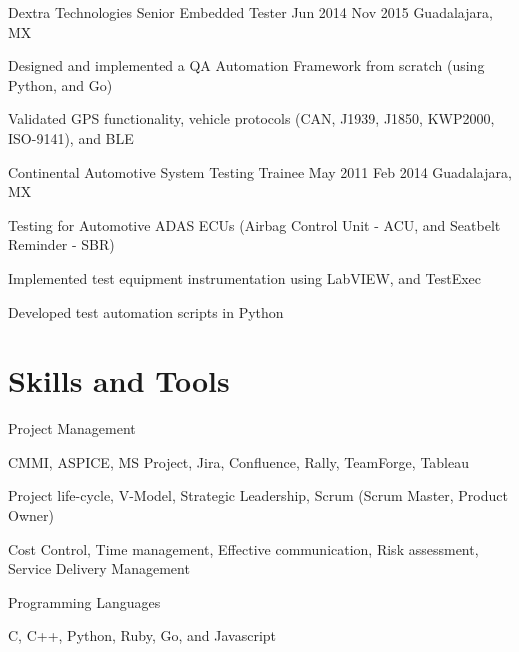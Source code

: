 \documentclass{resume} %
\begin{document}
\job
    {Dextra Technologies}
    {Senior Embedded Tester}
    {Jun 2014}
    {Nov 2015}
    {Guadalajara, MX}
    {
    \begin{itemize-bullets}
    \item{Designed and implemented a QA Automation Framework from scratch (using Python, and Go)}
    \item{Validated GPS functionality, vehicle protocols (CAN, J1939, J1850, KWP2000, ISO-9141), and BLE}
    \end{itemize-bullets}
    }


\job
    {Continental Automotive}
    {System Testing Trainee}
    {May 2011}
    {Feb 2014}
    {Guadalajara, MX}
    {
    \begin{itemize-bullets}
    \item{Testing for Automotive ADAS ECUs (Airbag Control Unit - ACU, and Seatbelt Reminder - SBR)}
    \item{Implemented test equipment instrumentation using LabVIEW, and TestExec}
    \item{Developed test automation scripts in Python}
    \end{itemize-bullets}
    }



\section{Skills and Tools}


\skillgroup
    {Project Management}
    {
    \begin{itemize-bullets}
        \item{CMMI, ASPICE, MS Project, Jira, Confluence, Rally, TeamForge, Tableau}
        \item{Project life-cycle, V-Model, Strategic Leadership, Scrum (Scrum Master, Product Owner)}
        \item{Cost Control, Time management, Effective communication, Risk assessment, Service Delivery Management}
        \end{itemize-bullets}
    }


\skillgroup
    {Programming Languages}
    {
    \begin{itemize-bullets}
        \item{C, C++, Python, Ruby, Go, and Javascript}
        \end{itemize-bullets}
    }
\end{document}
